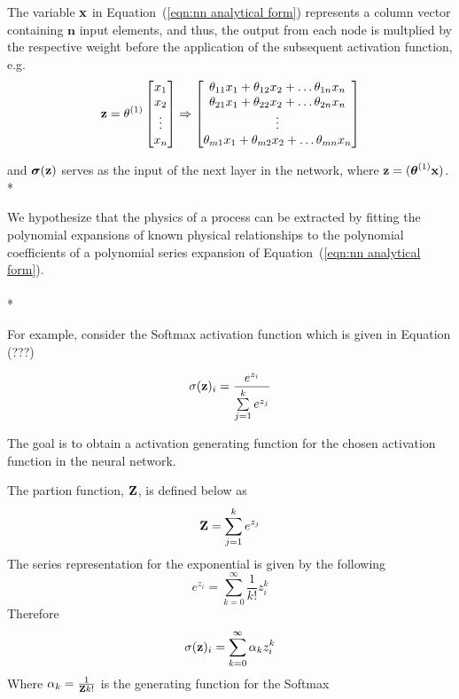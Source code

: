 The variable $\bold x$ in Equation~(\ref{eqn:nn analytical form}) represents a column vector containing $\boldsymbol n$ input elements, and thus, the output from each node is multplied by the respective weight before the application of the subsequent activation function, e.g.
\begin{equation}
	\bold z =
	\theta^{(1)} \begin{bmatrix}
				x_{1} \\
				x_{2} \\
				\vdots \\
				x_{n}
			\end{bmatrix}
	\Rightarrow \begin{bmatrix}
					\theta_{11} x_{1} + \theta_{12} x_{2} + \ldots \theta_{1n} x_{n} \\
					\theta_{21} x_{1} + \theta_{22} x_{2} + \ldots \theta_{2n} x_{n} \\
					\vdots \\
					\theta_{m1} x_{1} + \theta_{m2} x_{2} + \ldots \theta_{mn} x_{n} \\
				\end{bmatrix}
\end{equation}

and $\boldsymbol\sigma (\bold z)$ serves as the input of the next layer in the network, where $\bold z = (\boldsymbol\theta^{(1)} \bold x)$. \\*

We hypothesize that the physics of a process can be extracted by fitting the polynomial expansions of known physical relationships to the polynomial coefficients of a polynomial series expansion of Equation~(\ref{eqn:nn analytical form}). \\
\\*



For example, consider the Softmax activation function which is given in Equation (???)

\begin{equation}
	\sigma(\bold z)_i =
	\frac{e^{z_i}}{\sum\limits_{j=1}^k e^{z_j}}
\end{equation}

The goal is to obtain a activation generating function for the chosen activation function in the neural network. 

The partion function, $\bold Z$, is defined below as
\begin{equation}
	\bold Z = \sum\limits_{j=1}^k e^{z_j}
\end{equation}
The series representation for the exponential is given by the following
\begin{equation}
	e^{z_{i}} = \sum_{k=0}^{\infty}\frac{1}{k!} z_{i}^{k}
\end{equation}
Therefore
\begin{equation}
	\sigma(\bold z)_i = 
	\sum\limits_{k=0}^{\infty} \alpha_{k}z_{i}^{k}
\end{equation}
Where $\alpha_k = \frac{1}{{\bold Z}k!}$ is the generating function for the Softmax


